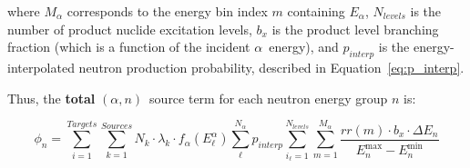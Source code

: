\documentclass[10pt]{article}
\newcommand{\alphn}[0]{$\left(\alpha,n\right)$}
\begin{document}
where $M_\alpha$ corresponds to the energy bin index $m$ containing $E_\alpha$, $N_{levels}$ is the number of product nuclide excitation levels, $b_x$ is the product level branching fraction (which is a function of the incident $\alpha$\ energy), and $p_{interp}$ is the energy-interpolated neutron production probability, described in Equation~\eqref{eq:p_interp}.

Thus, the \textbf{total} \alphn\ source term for each neutron energy group $n$ is:

\begin{equation}
\displaystyle \boxed{ \phi_n = \sum_{i=1}^{Targets} \sum_{k=1}^{Sources} N_k \cdot \lambda_k \cdot f_\alpha \left( E^\alpha_\ell  \right) \sum_{\ell}^{N_{\alpha}}  p_{interp} \sum_{i_\ell=1}^{N_{levels}} \sum_{m=1}^{M_\alpha}  \frac{rr\left(m\right)\cdot b_x \cdot \Delta E_n }{E_n^{\max} - E_n^{\min}}}
\end{equation}
\end{document}
